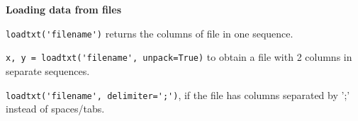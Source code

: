 \textbf{Loading data from files}

\lstinline|loadtxt('filename')| returns the columns of file in one
sequence. 

\lstinline|x, y = loadtxt('filename', unpack=True)| to obtain a file
with 2 columns in separate sequences. 

\lstinline|loadtxt('filename', delimiter=';')|, if the file has
columns separated by ';' instead of spaces/tabs. 


